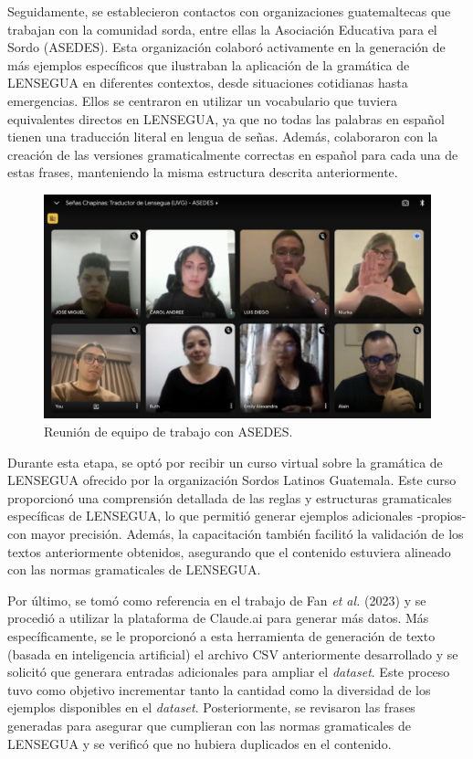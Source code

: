 Seguidamente, se establecieron contactos con organizaciones guatemaltecas que trabajan con la comunidad sorda, entre ellas la Asociación Educativa para el Sordo (ASEDES). Esta organización colaboró activamente en la generación de más ejemplos específicos que ilustraban la aplicación de la gramática de LENSEGUA en diferentes contextos, desde situaciones cotidianas hasta emergencias. Ellos se centraron en utilizar un vocabulario que tuviera equivalentes directos en LENSEGUA, ya que no todas las palabras en español tienen una traducción literal en lengua de señas. Además, colaboraron con la creación de las versiones gramaticalmente correctas en español para cada una de estas frases, manteniendo la misma estructura descrita anteriormente.

\vspace{0.5cm}
\begin{figure}[H]
  \centering
  \includegraphics[width=0.9\linewidth]{figuras/ASEDES.png}
  \caption{Reunión de equipo de trabajo con ASEDES.}
  \label{fig:ASEDES}
\end{figure}

Durante esta etapa, se optó por recibir un curso virtual sobre la gramática de LENSEGUA ofrecido por la organización Sordos Latinos Guatemala. Este curso proporcionó una comprensión detallada de las reglas y estructuras gramaticales específicas de LENSEGUA, lo que permitió generar ejemplos adicionales -propios- con mayor precisión. Además, la capacitación también facilitó la validación de los textos anteriormente obtenidos, asegurando que el contenido estuviera alineado con las normas gramaticales de LENSEGUA.

Por último, se tomó como referencia en el trabajo de Fan \textit{et al.} (2023) \cite{thirtyeight} y se procedió a utilizar la plataforma de Claude.ai para generar más datos. Más específicamente, se le proporcionó a esta herramienta de generación de texto (basada en inteligencia artificial) el archivo CSV anteriormente desarrollado y se solicitó que generara entradas adicionales para ampliar el \textit{dataset}. Este proceso tuvo como objetivo incrementar tanto la cantidad como la diversidad de los ejemplos disponibles en el \textit{dataset}. Posteriormente, se revisaron las frases generadas para asegurar que cumplieran con las normas gramaticales de LENSEGUA y se verificó que no hubiera duplicados en el contenido.


